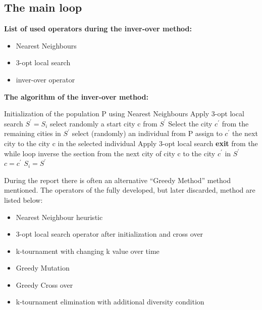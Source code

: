 \documentclass[a4paper,10pt]{article}
\begin{document}
\subsection{The main loop}
%

\textbf{List of used operators during the inver-over method:}
\begin{itemize}
	\item Nearest Neighbours
	\item 3-opt local search
	\item inver-over operator
	
\end{itemize}

\textbf{The algorithm of the inver-over method:}

\begin{algorithmic}
	\STATE Initialization of the population P using Nearest Neighbours
	\STATE Apply 3-opt local search
			\STATE $ S^{'} = S_{i} $
			\STATE select randomly a start city c from $ S^{'} $
				\STATE Select the city $ c^{'} $ from the remaining cities in $ S^{'} $
				\ELSE
				\STATE select (randomly) an individual from P
				\STATE assign to $ c^{'} $ the next city to the city c in the selected individual
				\ENDIF
				\STATE Apply 3-opt local search
				\STATE \textbf{exit} from the while loop
				\ENDIF 
				\STATE inverse the section from the next city of city c to the city $ c^{'} $ in $ S^{'} $ 
				\STATE $c = c^{'}$				
			\ENDWHILE
			\STATE $S_i =  S^{'}$
			\ENDIF
		\ENDFOR
	\ENDWHILE
\end{algorithmic}
\vspace{0.25cm}

During the report there is often an alternative ``Greedy Method'' method mentioned. The operators of the fully developed, but later discarded, method are listed below: 

\begin{itemize}
	\item Nearest Neighbour heuristic
	\item 3-opt local search operator after initialization and cross over
	\item k-tournament with changing k value over time
	\item Greedy Mutation
	\item Greedy Cross over
	\item k-tournament elimination with additional diversity condition
\end{itemize} 
\end{document}
